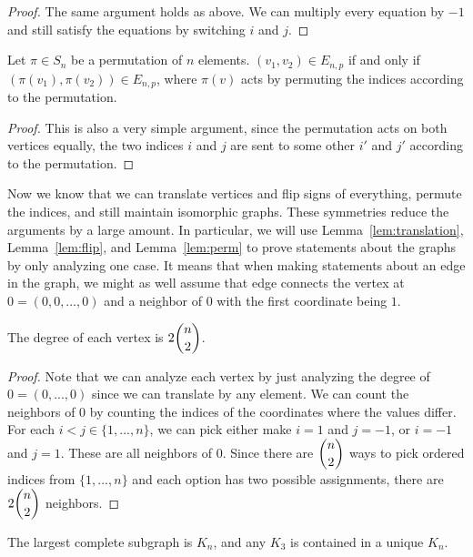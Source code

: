 \documentclass[runningheads,a4paper]{llncs}
\begin{document}
\begin{proof}
The same argument holds as above. We can multiply every equation by $-1$ and still satisfy the equations by switching $i$ and $j$.
\end{proof}

\begin{lemma}
\label{lem:perm}
Let $\pi \in S_n$ be a permutation of $n$ elements. $(v_1, v_2) \in E_{n,p}$ if and only if $(\pi(v_1), \pi(v_2)) \in E_{n,p}$, where $\pi(v)$ acts by permuting the indices according to the permutation. 
\end{lemma}

\begin{proof}
This is also a very simple argument, since the permutation acts on both vertices equally, the two indices $i$ and $j$ are sent to some other $i'$ and $j'$ according to the permutation.
\end{proof}

Now we know that we can translate vertices and flip signs of everything, permute the indices, and still maintain isomorphic graphs. These symmetries reduce the arguments by a large amount. In particular, we will use Lemma~\ref{lem:translation}, Lemma~\ref{lem:flip}, and Lemma~\ref{lem:perm} to prove statements about the graphs by only analyzing one case. It means that when making statements about an edge in the graph, we might as well assume that edge connects the vertex at $0 = (0,0,\dots, 0)$ and a neighbor of $0$ with the first coordinate being $1$. 

\begin{lemma}
The degree of each vertex is $2\dbinom{n}{2}$.
\end{lemma}

\begin{proof}
Note that we can analyze each vertex by just analyzing the degree of $0 = (0, ..., 0)$ since we can translate by any element. We can count the neighbors of 0 by counting the indices of the coordinates where the values differ. For each $i < j \in \{ 1, ..., n\}$, we can pick either make $i = 1$ and $j = -1$, or $i = -1$ and $j = 1$. These are all neighbors of $0$. Since there are $\dbinom{n}{2}$ ways to pick ordered indices from $\{1, ..., n\}$ and each option has two possible assignments, there are $2\dbinom{n}{2}$ neighbors.
\end{proof}

\begin{lemma}
\label{lem:largestcomplete}
The largest complete subgraph is $K_n$, and any $K_3$ is contained in a unique $K_n$.
\end{lemma}
\end{document}
